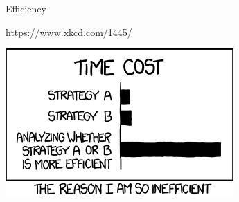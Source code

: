 \documentclass[aspectratio=169,usenames,dvipsnames]{beamer}
\begin{document}
\begin{frame}{Efficiency}
    \begin{reference}
        \url{https://www.xkcd.com/1445/}
    \end{reference}
    \centering\includegraphics[height=0.6\textheight]{fig/xkcdefficiency}
\end{frame}


%     
% 
% 
% 
% 
\end{document}

